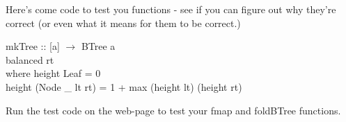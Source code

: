 \documentclass[11pt]{article}
\begin{document}
Here's come code to test you functions - see if you can figure out why they're
correct (or even what it means for them to be correct.)
\begin{smallprogram*}
\> mkTree :: [a] $\rightarrow$ BTree a   \\
 balanced rt \\
\>   where height Leaf = 0\\
\>         height (Node \_ lt rt) = 1 + max (height lt) (height rt)
\end{smallprogram*}

\begin{exercise}
Run the test code on the web-page to test your fmap and foldBTree functions.
\end{exercise}
\end{document}
